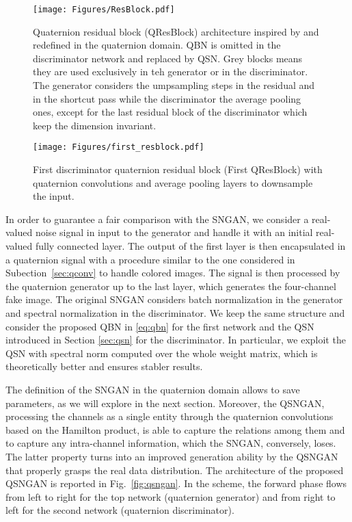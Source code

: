 \documentclass[graybox]{svmult}
\begin{document}
\begin{figure}[t]
    \centering
    \texttt{[image: Figures/ResBlock.pdf]}
    \caption{Quaternion residual block (QResBlock) architecture inspired by \cite{Miyato2018SpectralNF} and redefined in the quaternion domain. QBN is omitted in the discriminator network and replaced by QSN. Grey blocks means they are used exclusively in teh generator or in the discriminator. The generator considers the umpsampling steps in the residual and in the shortcut pass while the discriminator the average pooling ones, except for the last residual block of the discriminator which keep the dimension invariant.}
    \label{fig:resblock}
\end{figure}
\begin{figure}[t]
    \centering
    \texttt{[image: Figures/first\_resblock.pdf]}
    \caption{First discriminator quaternion residual block (First QResBlock) with quaternion convolutions and average pooling layers to downsample the input.}
    \label{fig:1resblock}
\end{figure}

In order to guarantee a fair comparison with the SNGAN, we consider a real-valued noise signal in input to the generator and handle it with an initial real-valued fully connected layer. The output of the first layer is then encapsulated in a quaternion signal with a procedure similar to the one considered in Subection~\ref{sec:qconv} to handle colored images. The signal is then processed by the quaternion generator up to the last layer, which generates the four-channel fake image. The original SNGAN considers batch normalization in the generator and spectral normalization in the discriminator. We keep the same structure and consider the proposed QBN in \eqref{eq:qbn} for the first network and the QSN introduced in Section \ref{sec:qsn} for the discriminator. In particular, we exploit the QSN with spectral norm computed over the whole weight matrix, which is theoretically better and ensures stabler results. 

The definition of the SNGAN in the quaternion domain allows to save parameters, as we will explore in the next section. Moreover, the QSNGAN, processing the channels as a single entity through the quaternion convolutions based on the Hamilton product, is able to capture the relations among them and to capture any intra-channel information, which the SNGAN, conversely, loses. The latter property turns into an improved generation ability by the QSNGAN that properly grasps the real data distribution. The architecture of the proposed QSNGAN is reported in Fig.~\ref{fig:qsngan}. In the scheme, the forward phase flows from left to right for the top network (quaternion generator) and from right to left for the second network (quaternion discriminator).
\end{document}
